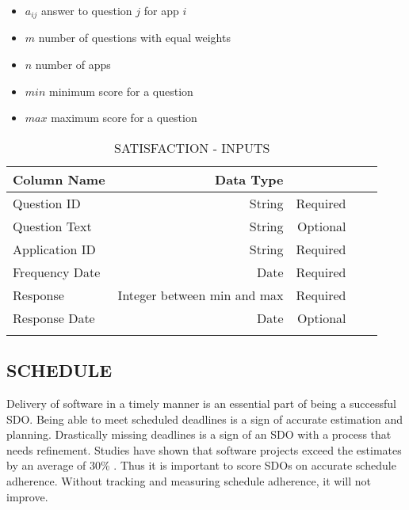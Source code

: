 \documentclass[SDSUThesis.tex]{subfiles}
\begin{document}
\begin{itemize}
\item $a_{i j}$ answer to question $j$ for app $i$
\item $m$ number of questions with equal weights
\item $n$ number of apps
\item $min$ minimum score for a question
\item $max$ maximum score for a question
\end{itemize}

\begin{longtable}{@{}l rr rr}

\toprule%
 \centering%
 {\bfseries Column Name}
 & {\bfseries Data Type}
 &  \\

\cmidrule[0.4pt](r{0.125em}){1-1}%
\cmidrule[0.4pt](lr{0.125em}){2-2}%
\cmidrule[0.4pt](l{0.125em}){3-3}%
\endhead

Question ID & String  & Required \\
\myrowcolour%
Question Text & String  & Optional \\
Application ID & String & Required \\
\myrowcolour%
Frequency Date & Date & Required \\
Response & Integer between min and max  & Required \\
\myrowcolour%
Response Date & Date & Optional \\

\bottomrule

\caption{SATISFACTION - INPUTS}
\label{tab:satisfaction}
\end{longtable}


\subsection{SCHEDULE}  

        Delivery of software in a timely manner is an essential part of being a 
        successful SDO.  Being able to meet scheduled deadlines is a sign of accurate
        estimation and planning.  Drastically missing deadlines is a sign of an SDO
        with a process that needs refinement.  Studies have shown that 
        software projects exceed the estimates by an average of
        30\% \cite{Jorgensen2014}.  Thus it is important to score SDOs on accurate
        schedule adherence. Without tracking and measuring schedule adherence, it will
        not improve.  
        
\end{document}
